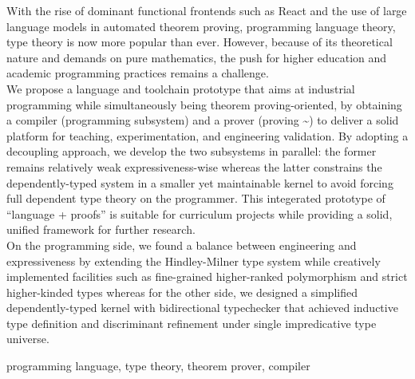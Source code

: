 \begin{eabstract}
  With the rise of dominant functional frontends such as React and the use of
  large language models in automated theorem proving, programming language theory, type theory
  is now more popular than ever. However, because of its theoretical nature and
  demands on pure mathematics, the push
  for higher education and academic programming practices remains a challenge.\\
  \indent We propose a language and toolchain prototype that aims at industrial programming while simultaneously being
  theorem proving-oriented, by obtaining a compiler (programming subsystem) and a prover (proving \textasciitilde) to
  deliver a solid platform for teaching, experimentation, and engineering validation.
  By adopting a decoupling approach, we develop the two subsystems in parallel: the former
  remains relatively weak expressiveness-wise whereas the latter constrains the dependently-typed system in a
  smaller yet maintainable kernel to avoid forcing full dependent type theory on the programmer. This integerated prototype
  of ``language + proofs'' is suitable for curriculum projects
  while providing a solid, unified framework for further research.\\
  \indent On the programming side, we found a balance between engineering and expressiveness by extending
  the Hindley-Milner type system while creatively implemented facilities such as fine-grained higher-ranked polymorphism and
  strict higher-kinded types whereas for the other side, we designed a simplified dependently-typed kernel with bidirectional
  typechecker that achieved inductive type definition and discriminant refinement under single impredicative type universe.
\end{eabstract}

\begin{ekeywords}
  programming language, type theory, theorem prover, compiler
\end{ekeywords}
\makeeabstract
